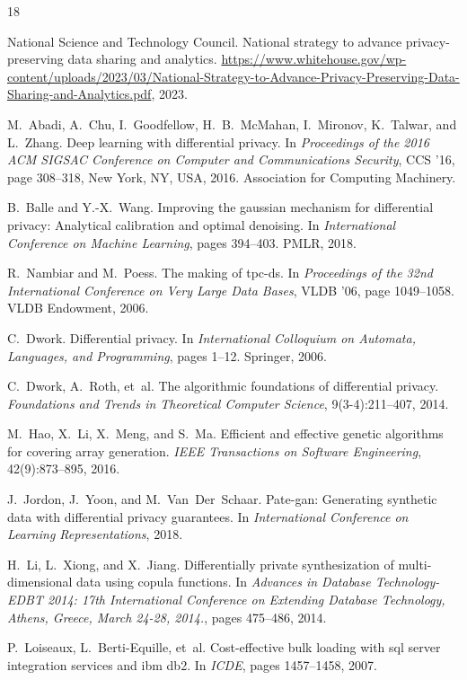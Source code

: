 \documentclass[11pt]{article}
\begin{document}
\begin{thebibliography}{18}

National Science and Technology Council. National strategy
to advance privacy-preserving data sharing and analytics.
\url{https://www.whitehouse.gov/wp-content/uploads/2023/03/National-Strategy-to-Advance-Privacy-Preserving-Data-Sharing-and-Analytics.pdf}, 2023.

M.~Abadi, A.~Chu, I.~Goodfellow, H.~B.~McMahan, I.~Mironov,
K.~Talwar, and L.~Zhang. Deep learning with differential privacy.
In \textit{Proceedings of the 2016 ACM SIGSAC Conference on Computer and
Communications Security}, CCS '16, page 308--318, New York, NY, USA, 2016.
Association for Computing Machinery.

B.~Balle and Y.-X.~Wang. Improving the gaussian mechanism for
differential privacy: Analytical calibration and optimal denoising.
In \textit{International Conference on Machine Learning}, pages 394--403.
PMLR, 2018.

R.~Nambiar and M.~Poess. The making of tpc-ds. In \textit{Proceedings of the
32nd International Conference on Very Large Data Bases}, VLDB '06,
page 1049--1058. VLDB Endowment, 2006.

C.~Dwork. Differential privacy. In \textit{International Colloquium on
Automata, Languages, and Programming}, pages 1--12. Springer, 2006.

C.~Dwork, A.~Roth, et~al. The algorithmic foundations of differential
privacy. \textit{Foundations and Trends in Theoretical Computer Science},
9(3-4):211--407, 2014.

M.~Hao, X.~Li, X.~Meng, and S.~Ma. Efficient and effective
genetic algorithms for covering array generation. \textit{IEEE Transactions
on Software Engineering}, 42(9):873--895, 2016.

J.~Jordon, J.~Yoon, and M.~Van~Der~Schaar. Pate-gan: Generating
synthetic data with differential privacy guarantees. In \textit{International
Conference on Learning Representations}, 2018.

H.~Li, L.~Xiong, and X.~Jiang. Differentially private synthesization
of multi-dimensional data using copula functions. In \textit{Advances in
Database Technology-EDBT 2014: 17th International Conference on
Extending Database Technology, Athens, Greece, March 24-28, 2014.},
pages 475--486, 2014.

P.~Loiseaux, L.~Berti-Equille, et~al. Cost-effective bulk loading
with sql server integration services and ibm db2. In \textit{ICDE},
pages 1457--1458, 2007.


\end{thebibliography}
\end{document}
